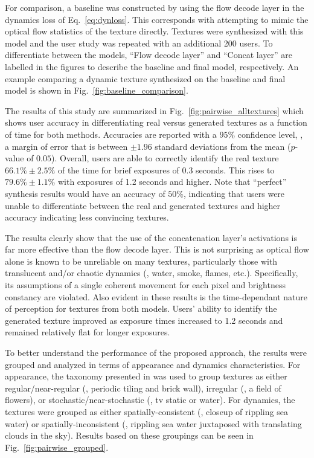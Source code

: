 For comparison, a baseline was constructed by using the 
flow decode layer in the dynamics loss of Eq.\ \ref{eq:dynloss}.
This corresponds with attempting to mimic the optical flow 
statistics of the texture directly.
Textures were synthesized with this model and the user study
was repeated with an additional 200 users.
To differentiate between the models, ``Flow decode layer'' 
and ``Concat layer'' are labelled in the figures to describe the
baseline and final model, respectively. An example comparing a dynamic texture synthesized on the baseline and final model is shown in Fig.\ \ref{fig:baseline_comparison}.



The results of this study are summarized in
Fig.\ \ref{fig:pairwise_alltextures} which shows user accuracy in
differentiating real versus generated textures as a function of
time for both methods. Accuracies are reported with a $95\%$ confidence level, \ie, a margin of error that is between $\pm 1.96$ standard deviations from the mean ($p$-value of $0.05$).
Overall, users are able to correctly identify the real texture
$66.1\% \pm 2.5\%$ of the time for brief 
exposures of 0.3 seconds.
This rises to $79.6\% \pm 1.1\%$ with exposures of 1.2 seconds 
and higher.
Note that ``perfect'' synthesis results would have an accuracy
of $50\%$, indicating that users were unable to differentiate 
between the real and generated textures and higher accuracy 
indicating less convincing textures.



The results clearly show that the use of the concatenation 
layer's activations is far more effective than the flow decode 
layer.
This is not surprising as optical flow alone is known to be 
unreliable on many textures, particularly those with
translucent and/or chaotic dynamics (\eg, water, smoke, flames, etc.). Specifically, its assumptions of a single coherent movement for each pixel and brightness constancy are violated.
Also evident in these results is the time-dependant nature of 
perception for textures from both models.
Users' ability to identify the generated texture improved as 
exposure times increased to 1.2 seconds and remained relatively 
flat for longer exposures.

To better understand the performance of the proposed approach,
the results were grouped and analyzed in terms of
appearance and dynamics characteristics.
For appearance, the taxonomy
presented in \cite{lin2006quantitative} was used to group textures as
either regular/near-regular (\eg, periodic tiling and brick wall), 
irregular (\eg, a field of flowers), or
stochastic/near-stochastic (\eg, tv static or water).
For dynamics, the textures were grouped as either 
spatially-consistent (\eg, closeup of rippling sea water) or 
spatially-inconsistent (\eg, rippling sea water juxtaposed 
with translating clouds in the sky).
Results based on these groupings can be seen in
Fig.\ \ref{fig:pairwise_grouped}.

